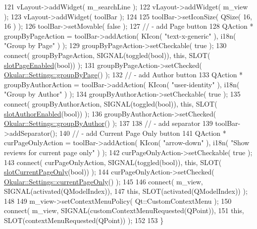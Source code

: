 \begin{DoxyCode}
121     vLayout->addWidget( m\_searchLine );
122     vLayout->addWidget( m\_view );
123     vLayout->addWidget( toolBar );
124 
125     toolBar->setIconSize( QSize( 16, 16 ) );
126     toolBar->setMovable( \textcolor{keyword}{false} );
127     \textcolor{comment}{// - add Page button}
128     QAction * groupByPageAction = toolBar->addAction( KIcon( \textcolor{stringliteral}{"text-x-generic"} ), i18n( \textcolor{stringliteral}{"Group by Page"} ) );
129     groupByPageAction->setCheckable( \textcolor{keyword}{true} );
130     connect( groupByPageAction, SIGNAL(toggled(\textcolor{keywordtype}{bool})), \textcolor{keyword}{this}, SLOT(
      \hyperlink{classReviews_a884ff0b3c877df9ac8712fbb12508889}{slotPageEnabled}(\textcolor{keywordtype}{bool})) );
131     groupByPageAction->setChecked( \hyperlink{classOkular_1_1Settings_ada3fd3c60d72a0876746831fd3fe2b0a}{Okular::Settings::groupByPage}() );
132     \textcolor{comment}{// - add Author button}
133     QAction * groupByAuthorAction = toolBar->addAction( KIcon( \textcolor{stringliteral}{"user-identity"} ), i18n( \textcolor{stringliteral}{"Group by Author"} )
       );
134     groupByAuthorAction->setCheckable( \textcolor{keyword}{true} );
135     connect( groupByAuthorAction, SIGNAL(toggled(\textcolor{keywordtype}{bool})), \textcolor{keyword}{this}, SLOT(
      \hyperlink{classReviews_ab14f6fd357e839d3af49183c1e835ab7}{slotAuthorEnabled}(\textcolor{keywordtype}{bool})) );
136     groupByAuthorAction->setChecked( \hyperlink{classOkular_1_1Settings_a6da9b5ed7cd5aad9091b9218b2f1f85e}{Okular::Settings::groupByAuthor}() );
137 
138     \textcolor{comment}{// - add separator}
139     toolBar->addSeparator();
140     \textcolor{comment}{// - add Current Page Only button}
141     QAction * curPageOnlyAction = toolBar->addAction( KIcon( \textcolor{stringliteral}{"arrow-down"} ), i18n( \textcolor{stringliteral}{"Show reviews for
       current page only"} ) );
142     curPageOnlyAction->setCheckable( \textcolor{keyword}{true} );
143     connect( curPageOnlyAction, SIGNAL(toggled(\textcolor{keywordtype}{bool})), \textcolor{keyword}{this}, SLOT(
      \hyperlink{classReviews_a96f6cafbb26eba382c4e85ef5be47c5d}{slotCurrentPageOnly}(\textcolor{keywordtype}{bool})) );
144     curPageOnlyAction->setChecked( \hyperlink{classOkular_1_1Settings_a73ac0013d8755f5b601064516b201406}{Okular::Settings::currentPageOnly}() );
145 
146     connect( m\_view, SIGNAL(activated(QModelIndex)),
147              \textcolor{keyword}{this}, SLOT(activated(QModelIndex)) );
148 
149     m\_view->setContextMenuPolicy( Qt::CustomContextMenu );
150     connect( m\_view, SIGNAL(customContextMenuRequested(QPoint)),
151              \textcolor{keyword}{this}, SLOT(contextMenuRequested(QPoint)) );
152 
153 \}
\end{DoxyCode}
